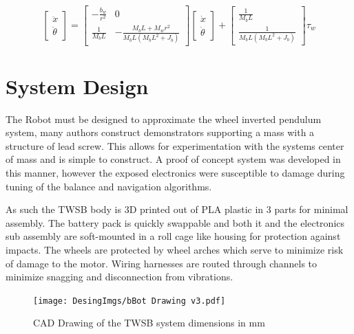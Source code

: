     \begin{equation}
        \begin{bmatrix}
            \ddot{x} \\
            \ddot{\theta}
        \end{bmatrix}
        =
        \begin{bmatrix}
            -\frac{b_w}{r^2} & 0 \\
            \frac{1}{M_b L} & -\frac{M_b L + M_w r^2}{M_b L (M_b L^2 + J_b)}
        \end{bmatrix}
        \begin{bmatrix}
            \dot{x} \\
            \dot{\theta}
        \end{bmatrix}
        +
        \begin{bmatrix}
            \frac{1}{M_b L} \\
            \frac{1}{M_b L (M_b L^2 + J_b)}
        \end{bmatrix}
        \tau_w
        \label{eq:2DOF}
    \end{equation}


   

    
    \pagebreak{}


    \section{System Design}
        The Robot must be designed to approximate the wheel inverted pendulum system, many authors 
        construct demonstrators supporting a mass with a structure of lead screw. This allows for experimentation 
        with the systems center of mass and is simple to construct. A proof of concept system was developed in this manner, 
        however the exposed electronics were susceptible to damage during tuning of the balance and navigation algorithms.

        As such the TWSB body is 3D printed out of PLA plastic in 3 parts for minimal assembly.
        The battery pack is quickly swappable and both it and the electronics sub assembly 
        are soft-mounted in a roll cage like housing for protection against impacts. 
        The wheels are protected by wheel arches which serve to minimize risk of damage to the motor. 
        Wiring harnesses are routed through channels to minimize snagging and disconnection from vibrations.
        
        \begin{figure}[H]
            \texttt{[image: DesingImgs/bBot Drawing v3.pdf]}
            \caption{CAD Drawing of the TWSB system dimensions in mm}
            \label{fig:CAD}
        \end{figure}


